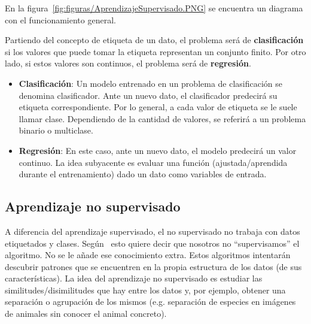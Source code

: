 En la figura~\ref{fig:figuras/AprendizajeSupervisado.PNG} se encuentra un diagrama con el funcionamiento general.


Partiendo del concepto de etiqueta de un dato, el problema será de \textbf{clasificación} si los valores que puede tomar la etiqueta representan un conjunto finito. Por otro lado, si estos valores son continuos, el problema será de \textbf{regresión}.

\begin{itemize}
    \item \textbf{Clasificación}: Un modelo entrenado en un problema de clasificación se denomina clasificador. Ante un nuevo dato, el clasificador predecirá su etiqueta correspondiente. Por lo general, a cada valor de etiqueta se le suele llamar clase. Dependiendo de la cantidad de valores, se referirá a un problema binario o multiclase.

    \item \textbf{Regresión}: En este caso, ante un nuevo dato, el modelo predecirá un valor continuo. La idea subyacente es evaluar una función (ajustada/aprendida durante el entrenamiento) dado un dato como variables de entrada.

\end{itemize}


\subsection{Aprendizaje no supervisado}
\label{aprendizaje-no-supervisado}

A diferencia del aprendizaje supervisado, el no supervisado no trabaja con datos etiquetados y clases. Según~\cite{salim:usl} esto quiere decir que nosotros no ``supervisamos'' el algoritmo. No se le añade ese conocimiento extra. Estos algoritmos intentarán descubrir patrones que se encuentren en la propia estructura de los datos (de sus características). La idea del aprendizaje no supervisado es estudiar las similitudes/disimilitudes que hay entre los datos y, por ejemplo, obtener una separación o agrupación de los mismos (e.g. separación de especies en imágenes de animales sin conocer el animal concreto).
 
